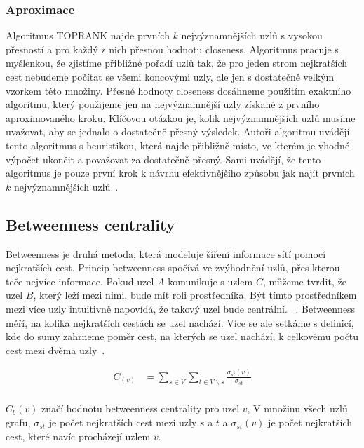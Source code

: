 \documentclass{bakalarka}
\begin{document}
\subsubsection{Aproximace}
Algoritmus TOPRANK najde prvních $k$ nejvýznamnějších uzlů
s vysokou přesností a pro každý z nich přesnou hodnotu closeness.  Algoritmus
pracuje s myšlenkou, že zjistíme přibližné pořadí uzlů tak, že pro jeden strom
nejkratších cest nebudeme počítat se všemi koncovými uzly, ale jen s dostatečně
velkým vzorkem této množiny.  Přesné hodnoty closeness dosáhneme použitím
exaktního algoritmu, který použijeme jen na nejvýznamnější uzly získané z
prvního aproximovaného kroku. Klíčovou otázkou je, kolik nejvýznamnějších uzlů
musíme uvažovat, aby se jednalo o dostatečně přesný výsledek. Autoři algoritmu
uvádějí tento algoritmus s heuristikou, která najde přibližně místo, ve kterém
je vhodné výpočet ukončit a považovat za dostatečně přesný. Sami uvádějí, že
tento algoritmus je pouze první krok k návrhu efektivnějšího způsobu jak najít
prvních $k$ nejvýznamnějších uzlů~\citep{closenessapproximation}.

\subsection{Betweenness centrality}
Betweenness je druhá metoda, která modeluje šíření informace sítí pomocí
nejkratších cest. Princip betweenness spočívá ve zvýhodnění uzlů, přes kterou
teče nejvíce informace. Pokud uzel $A$ komunikuje s uzlem $C$, můžeme tvrdit,
že uzel $B$, který leží mezi nimi, bude mít roli prostředníka. Být tímto
prostředníkem mezi více uzly intuitivně napovídá, že takový uzel bude
centrální. ~\citep{hannemanriddle2005}. Betweenness
měří, na kolika nejkratších cestách se uzel nachází. Více se ale setkáme s
definicí, kde do sumy zahrneme poměr cest, na kterých se uzel nachází, k
celkovému počtu cest mezi dvěma uzly~\citep{freeman1977,anthonisse1971,brandes2001}.

\begin{align*}
C_(v) &= \displaystyle\sum\limits_{s \in V} \displaystyle\sum\limits_{t \in V \backslash s} \frac{\sigma_{st}(v)}{\sigma_{st}} \\
\end{align*}

$C_b(v)$ značí hodnotu betweenness centrality pro uzel $v$, V množinu všech
uzlů grafu, $\sigma_{st}$ je počet nejkratších cest mezi uzly $s$ a $t$ a
$\sigma_{st}(v)$ je počet nejkratších cest, které navíc procházejí uzlem $v$.
\end{document}
